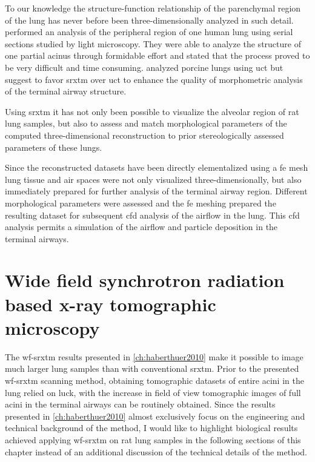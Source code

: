 To our knowledge the structure-function relationship of the parenchymal region of the lung has never before been three-dimensionally analyzed in such detail. \citet{Berend1991} performed an analysis of the peripheral region of one human lung using serial sections studied by light microscopy. They were able to analyze the structure of one partial acinus through formidable effort and stated that the process proved to be very difficult and time consuming. \citet{Litzlbauer2006} analyzed porcine lungs using \ac{uct} but suggest to favor \ac{srxtm} over \ac{uct} to enhance the quality of morphometric analysis of the terminal airway structure.

Using \ac{srxtm} it has not only been possible to visualize the alveolar region of rat lung samples, but also to assess and match morphological parameters of the computed three-dimensional reconstruction to prior stereologically assessed parameters of these lungs.

Since the reconstructed datasets have been directly elementalized using a \ac{fe} mesh lung tissue and air spaces were not only visualized three-dimensionally, but also immediately prepared for further analysis of the terminal airway region. Different morphological parameters were assessed and the \ac{fe} meshing prepared the resulting dataset for subsequent \ac{cfd} analysis of the airflow in the lung. This \ac{cfd} analysis permits a simulation of the airflow \cite{Filipovic2010} and particle deposition in the terminal airways.

\section[WF-SRXTM]{Wide field synchrotron radiation based x-ray tomographic microscopy}
The \ac{wf-srxtm} results presented in \autoref{ch:haberthuer2010} make it possible to image much larger lung samples than with conventional \ac{srxtm}. Prior to the presented \ac{wf-srxtm} scanning method, obtaining tomographic datasets of entire acini in the lung relied on luck, with the increase in field of view tomographic images of full acini in the terminal airways can be routinely obtained. Since the results presented in \autoref{ch:haberthuer2010} almost exclusively focus on the engineering and technical background of the method, I would like to highlight biological results achieved applying \ac{wf-srxtm} on rat lung samples in the following sections of this chapter instead of an additional discussion of the technical details of the method.

